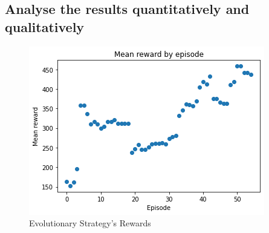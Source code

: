 \documentclass[a4pape, 11pt, english]{article}
\begin{document}
\subsection{Analyse the results quantitatively and qualitatively}

\begin{figure}[h!]
	\begin{center}
		\includegraphics{img/SpaceInvaderRewards2.png}
		\caption{Evolutionary Strategy's Rewards}
		\label{fig:SpaceInvaderRewards}
	\end{center}
\end{figure}

\end{document}
